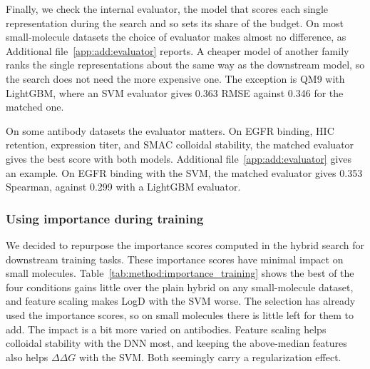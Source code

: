 Finally, we check the internal evaluator, the model that scores each single representation during the search and so sets its share of the budget. On most small-molecule datasets the choice of evaluator makes almost no difference, as Additional file~\ref{app:add:evaluator} reports. A cheaper model of another family ranks the single representations about the same way as the downstream model, so the search does not need the more expensive one. The exception is QM9 with LightGBM, where an SVM evaluator gives 0.363 RMSE against 0.346 for the matched one.

On some antibody datasets the evaluator matters. On EGFR binding, HIC retention, expression titer, and SMAC colloidal stability, the matched evaluator gives the best score with both models. Additional file~\ref{app:add:evaluator} gives an example. On EGFR binding with the SVM, the matched evaluator gives 0.353 Spearman, against 0.299 with a LightGBM evaluator.



\subsubsection{Using importance during training}

We decided to repurpose the importance scores computed in the hybrid search for downstream training tasks. These importance scores have minimal impact on small molecules. Table~\ref{tab:method:importance_training} shows the best of the four conditions gains little over the plain hybrid on any small-molecule dataset, and feature scaling makes LogD with the SVM worse. The selection has already used the importance scores, so on small molecules there is little left for them to add. The impact is a bit more varied on antibodies. Feature scaling helps colloidal stability with the DNN most, and keeping the above-median features also helps $\Delta\Delta G$ with the SVM. Both seemingly carry a regularization effect. 

